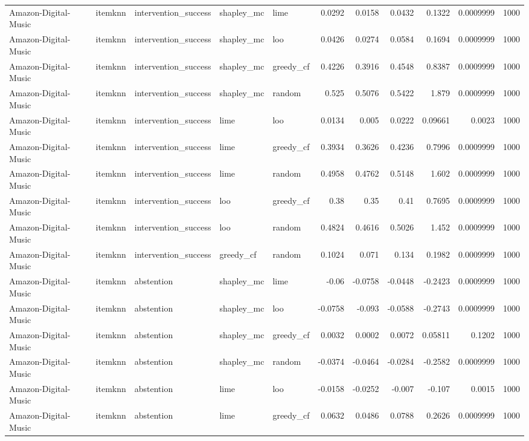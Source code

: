 \begin{table}[t]
\begin{tabular}{lllllrrrrrr}
Amazon-Digital-Music & itemknn & intervention\_success & shapley\_mc & lime & 0.0292 & 0.0158 & 0.0432 & 0.1322 & 0.0009999 & 1000 \\
Amazon-Digital-Music & itemknn & intervention\_success & shapley\_mc & loo & 0.0426 & 0.0274 & 0.0584 & 0.1694 & 0.0009999 & 1000 \\
Amazon-Digital-Music & itemknn & intervention\_success & shapley\_mc & greedy\_cf & 0.4226 & 0.3916 & 0.4548 & 0.8387 & 0.0009999 & 1000 \\
Amazon-Digital-Music & itemknn & intervention\_success & shapley\_mc & random & 0.525 & 0.5076 & 0.5422 & 1.879 & 0.0009999 & 1000 \\
Amazon-Digital-Music & itemknn & intervention\_success & lime & loo & 0.0134 & 0.005 & 0.0222 & 0.09661 & 0.0023 & 1000 \\
Amazon-Digital-Music & itemknn & intervention\_success & lime & greedy\_cf & 0.3934 & 0.3626 & 0.4236 & 0.7996 & 0.0009999 & 1000 \\
Amazon-Digital-Music & itemknn & intervention\_success & lime & random & 0.4958 & 0.4762 & 0.5148 & 1.602 & 0.0009999 & 1000 \\
Amazon-Digital-Music & itemknn & intervention\_success & loo & greedy\_cf & 0.38 & 0.35 & 0.41 & 0.7695 & 0.0009999 & 1000 \\
Amazon-Digital-Music & itemknn & intervention\_success & loo & random & 0.4824 & 0.4616 & 0.5026 & 1.452 & 0.0009999 & 1000 \\
Amazon-Digital-Music & itemknn & intervention\_success & greedy\_cf & random & 0.1024 & 0.071 & 0.134 & 0.1982 & 0.0009999 & 1000 \\
Amazon-Digital-Music & itemknn & abstention & shapley\_mc & lime & -0.06 & -0.0758 & -0.0448 & -0.2423 & 0.0009999 & 1000 \\
Amazon-Digital-Music & itemknn & abstention & shapley\_mc & loo & -0.0758 & -0.093 & -0.0588 & -0.2743 & 0.0009999 & 1000 \\
Amazon-Digital-Music & itemknn & abstention & shapley\_mc & greedy\_cf & 0.0032 & 0.0002 & 0.0072 & 0.05811 & 0.1202 & 1000 \\
Amazon-Digital-Music & itemknn & abstention & shapley\_mc & random & -0.0374 & -0.0464 & -0.0284 & -0.2582 & 0.0009999 & 1000 \\
Amazon-Digital-Music & itemknn & abstention & lime & loo & -0.0158 & -0.0252 & -0.007 & -0.107 & 0.0015 & 1000 \\
Amazon-Digital-Music & itemknn & abstention & lime & greedy\_cf & 0.0632 & 0.0486 & 0.0788 & 0.2626 & 0.0009999 & 1000 \\

\end{tabular}
\end{table}
